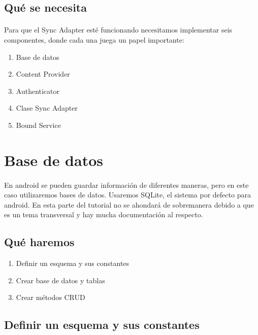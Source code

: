 \documentclass[10pt]{extarticle}
\begin{document}
\subsection{Qué se necesita}

\paragraph{}
Para que el Sync Adapter esté funcionando necesitamos implementar seis componentes, donde cada una juega un papel importante:

\begin{enumerate}
 \item Base de datos
 \item Content Provider
 \item Authenticator
 \item Clase Sync Adapter
 \item Bound Service
\end{enumerate}



\section{Base de datos}

\paragraph{}
En android se pueden guardar información de diferentes maneras, pero en este caso utilizaremos bases de datos. Usaremos SQLite, el sistema por defecto para android. En esta parte del tutorial no se ahondará de sobremanera debido a que es un tema transversal y hay mucha documentación al respecto.

\subsection{Qué haremos}

\begin{enumerate}
 \item Definir un esquema y sus constantes
 \item Crear base de datos y tablas
 \item Crear métodos CRUD
\end{enumerate}

\subsection{Definir un esquema y sus constantes}
\end{document}
